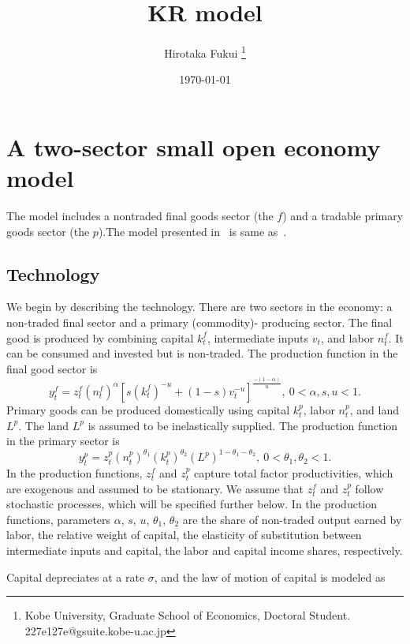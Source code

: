 \documentclass[11pt,a4paper]{article}
\title{KR model}
\author{Hirotaka Fukui \thanks{Kobe University, Graduate School of Economics, Doctoral Student. 227e127e@gsuite.kobe-u.ac.jp}}
\date{\today}
\numberwithin{equation}{section}
\theoremstyle{definition}
\begin{document}
\maketitle
\begin{abstract}
\end{abstract}
%
\section{A two-sector small open economy model}
The model includes a nontraded final goods sector (the $f$) and a tradable primary goods sector (the $p$).The model presented in~\citet{KOSE200155} is same as~\citet{kose_explaining_2002}.
%
\subsection{Technology}
We begin by describing the technology. There are two sectors in the economy: a non-traded final sector and a primary (commodity)- producing sector. The final good is produced by combining capital $ k^{f}_{t}$, intermediate inputs $v_{t}$, and labor $ n^{f}_{t}$. It can be consumed and invested but is non-traded. The production function in the final good sector is 
\begin{equation}
\label{eq_kr_y_f}
y^{f}_{t}=z^{f}_{t}(n^{f}_{t})^{\alpha}\left[s(k^{f}_{t})^{-u}+(1-s)v_{t}^{-u}\right]^{\frac{-(1-\alpha)}{u}},~0<\alpha, s, u<1.
\end{equation}
Primary goods can be produced domestically using capital $k^{p}_{t}$, labor $n^{p}_{t}$, and land $L^{p}$. The land $L^{p}$ is assumed to be inelastically supplied. The production function in the primary sector is 
\begin{equation}
\label{eq_kr_y_p}
y^{p}_{t}=z^{p}_{t}(n^{p}_{t})^{\theta_{1}}(k^{p}_{t})^{\theta_{2}}(L^{p})^{1-\theta_{1}-\theta_{2}},~0<\theta_{1}, \theta_{2}<1. 
\end{equation}
In the production functions, $z^{f}_{t}$ and $z^{p}_{t}$ capture total factor productivities, which are exogenous and assumed to be stationary. We assume that $z^{f}_{t}$ and $z^{p}_{t}$ follow stochastic processes, which will be specified further below. In the production functions, parameters $\alpha$, $s$, $u$, $\theta_{1}$, $\theta_{2}$ are the share of non-traded output earned by labor, the relative weight of capital, the elasticity of substitution between intermediate inputs and capital, the labor and capital income shares, respectively. 
\par
Capital depreciates at a rate $\sigma$, and the law of motion of capital is modeled as
\end{document}
